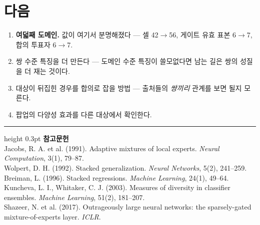 \documentclass[10pt]{article}
\begin{document}
\section{다음}

\begin{enumerate}[leftmargin=1.3em,itemsep=0.15em]
\item \textbf{여덟째 도메인.} 값이 여기서 분명해졌다 --- 셀 42$\to$56, 게이트
      유효 표본 6$\to$7, 합의 투표자 6$\to$7.
\item 쌍 수준 특징을 더 만든다 --- 도메인 수준 특징이 쓸모없다면 남는 길은
      쌍의 성질을 더 재는 것이다.
\item 대상이 뒤집힌 경우를 합의로 잡을 방법 --- 출처들의 \emph{쌍끼리} 관계를
      보면 될지 모른다.
\item 팝업의 다양성 효과를 다른 대상에서 확인한다.
\end{enumerate}

\vspace{0.6em}
\hrule height 0.3pt
\vspace{0.5em}
{\footnotesize
\textbf{참고문헌}\\[0.3em]
Jacobs, R. A. et al. (1991). Adaptive mixtures of local experts.
\emph{Neural Computation}, 3(1), 79--87.\\[0.15em]
Wolpert, D. H. (1992). Stacked generalization. \emph{Neural Networks}, 5(2), 241--259.\\[0.15em]
Breiman, L. (1996). Stacked regressions. \emph{Machine Learning}, 24(1), 49--64.\\[0.15em]
Kuncheva, L. I., Whitaker, C. J. (2003). Measures of diversity in classifier
ensembles. \emph{Machine Learning}, 51(2), 181--207.\\[0.15em]
Shazeer, N. et al. (2017). Outrageously large neural networks: the
sparsely-gated mixture-of-experts layer. \emph{ICLR}.
}
\end{document}

